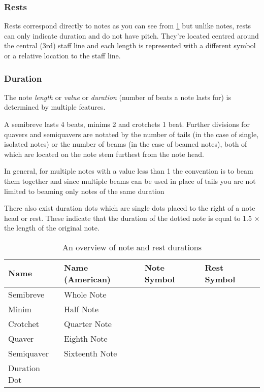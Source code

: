 \subsubsection{Rests}
\label{sec:music-theory-rests}

Rests correspond directly to notes as you can see from \cref{table:note-lengths} but unlike notes, rests can only indicate duration and do not have pitch. They're located centred around the central (3rd) staff line and each length is represented with a different symbol or a relative location to the staff line.

\subsubsection{Duration}
\label{sec:music-theory-duration}

The note \emph{length} or \emph{value} or \emph{duration} (number of beats a note lasts for) is determined by multiple features.

A semibreve lasts 4 beats, minims 2 and crotchets 1 beat. Further divisions for quavers and semiquavers are notated by the number of tails (in the case of single, isolated notes) or the number of beams (in the case of beamed notes), both of which are located on the note stem furthest from the note head.

In general, for multiple notes with a value less than 1 the convention is to beam them together and since multiple beams can be used in place of tails you are not limited to beaming only notes of the same duration

There also exist duration dots which are single dots placed to the right of a note head or rest. These indicate that the duration of the dotted note is equal to 1.5 $\times$ the length of the original note.

\begin{table}[H]
    \renewcommand{\arraystretch}{1.8}
    \centering
    \begin{tabularx}{\textwidth}{ llll }
        \toprule

        Name & Name (American) & Note Symbol & Rest Symbol \\
        \midrule
        Semibreve & Whole Note & & \\
        Minim & Half Note & & \\
        Crotchet & Quarter Note & & \\
        Quaver & Eighth Note & & \\
        Semiquaver & Sixteenth Note & & \\
        Duration Dot & & & \\
        \bottomrule
    \end{tabularx}
    \caption{An overview of note and rest durations}
    \label{table:note-lengths}
\end{table}


